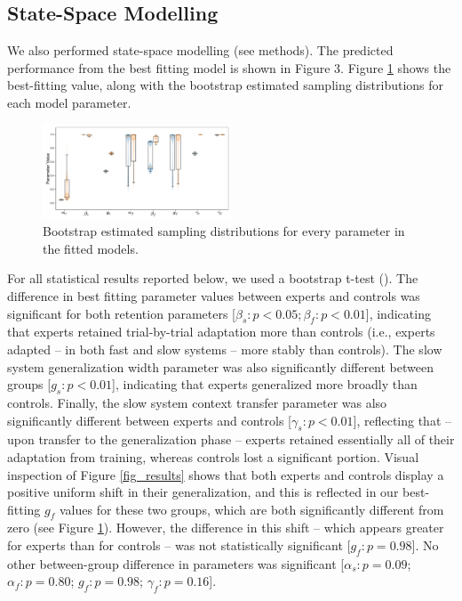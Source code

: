 \documentclass[jou, apacite, 11pt, longtable, floatsintext, notab]{apa6}
\begin{document}
\subsection{State-Space Modelling}
We also performed state-space modelling (see methods). The
predicted performance from the best fitting model is shown
in Figure 3. Figure \ref{fig_params} shows the best-fitting
value, along with the bootstrap estimated sampling
distributions for each model parameter.
\begin{figure}[h]
  \centering
  \includegraphics[width=0.5\textwidth]{figures/fig_params.pdf}
  \caption{\scriptsize
    Bootstrap estimated sampling distributions for every
    parameter in the fitted models.
  }
  \label{fig_params}
\end{figure}
For all statistical results reported below, we used a
bootstrap t-test (\cite{REFERENCE}). The difference in best
fitting parameter values between experts and controls was
significant for both retention parameters [$\beta_s: p<0.05;
\beta_f: p<0.01$], indicating that experts retained
trial-by-trial adaptation more than controls (i.e., experts
adapted -- in both fast and slow systems -- more stably than
controls). The slow system generalization width parameter
was also significantly different between groups [$g_s:
p<0.01$], indicating that experts generalized more broadly
than controls. Finally, the slow system context transfer
parameter was also significantly different between experts
and controls [$\gamma_s: p < 0.01$], reflecting that -- upon
transfer to the generalization phase -- experts retained
essentially all of their adaptation from training, whereas
controls lost a significant portion. Visual inspection of
Figure \ref{fig_results} shows that both experts and
controls display a positive uniform shift in their
generalization, and this is reflected in our best-fitting
$g_f$ values for these two groups, which are both
significantly different from zero (see Figure
\ref{fig_params}). However, the difference in this shift --
which appears greater for experts than for controls -- was
not statistically significant [$g_f: p=0.98$]. No other
between-group difference in parameters was significant
[$\alpha_s: p=0.09$; $\alpha_f: p=0.80$; $g_f: p=0.98$;
$\gamma_f: p=0.16$].
\end{document}
